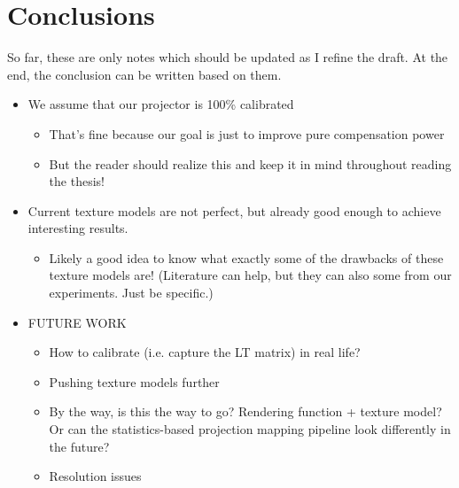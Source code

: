 \chapter{Conclusions}
\label{chapter:conclusions}

{\color{red} So far, these are only notes which should be updated as I refine the draft. At the end, the conclusion can be written based on them.}

\begin{itemize}
    \item We assume that our projector is 100\% calibrated
        \begin{itemize}
            \item That's fine because our goal is just to improve pure compensation power
            \item But the reader should realize this and keep it in mind throughout reading the thesis!
        \end{itemize}
    \item Current texture models are not perfect, but already good enough to achieve interesting results.
        \begin{itemize}
            \item Likely a good idea to know what exactly some of the drawbacks of these texture models are! (Literature can help, but they can also some from our experiments. Just be specific.)
        \end{itemize}
    \item FUTURE WORK
        \begin{itemize}
            \item How to calibrate (i.e. capture the LT matrix) in real life?
            \item Pushing texture models further
            \item By the way, is this the way to go? Rendering function + texture model? Or can the statistics-based projection mapping pipeline look differently in the future?
            \item Resolution issues
        \end{itemize}
\end{itemize}